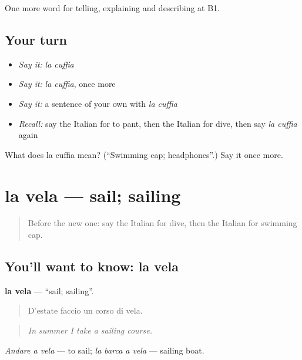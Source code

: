 \begin{grammarlens}[title={What you've built}]
One more word for telling, explaining and describing at B1.
\end{grammarlens}

\subsection*{Your turn}
\begin{itemize}
\raggedright
  \item \emph{Say it:} \emph{la cuffia}
  \item \emph{Say it:} \emph{la cuffia}, once more
  \item \emph{Say it:} a sentence of your own with \emph{la cuffia}
  \item \emph{Recall:} say the Italian for to pant, then the Italian for dive, then say \emph{la cuffia} again
\end{itemize}

\begin{tcolorbox}[breakable,colback=teal!4,colframe=teal!35!black,title={Before you move on}]
What does la cuffia mean? (\textquotedblleft{}Swimming cap; headphones\textquotedblright{}.) Say it once more.
\end{tcolorbox}
\section[la vela]{la vela — sail; sailing}

\label{lesson:IT-C514-vela}



\begin{quote}
Before the new one: say the Italian for dive, then the Italian for swimming cap.
\end{quote}

\subsection*{You'll want to know: la vela}
\textbf{la vela} — \textquotedblleft{}sail; sailing\textquotedblright{}.

\begin{quote}
D'estate faccio un corso di vela.
\end{quote}

\begin{quote}
\emph{In summer I take a sailing course.}
\end{quote}

\emph{Andare a vela} — to sail; \emph{la barca a vela} — sailing boat.

